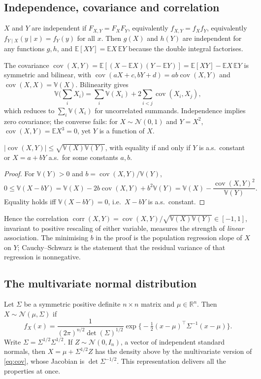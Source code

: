 \documentclass[11pt,a4paper]{article}
\newcommand{\E}{\mathbb{E}}
\newcommand{\V}{\mathbb{V}}
\newcommand{\R}{\mathbb{R}}
\newcommand{\N}{\mathcal{N}}
\newcommand{\Cov}{\operatorname{cov}}
\newcommand{\Corr}{\operatorname{corr}}
\begin{document}
\subsection{Independence, covariance and correlation}

$X$ and $Y$ are independent if $F_{X,Y}=F_XF_Y$, equivalently $f_{X,Y}=f_Xf_Y$, equivalently $f_{Y\mid X}(y\mid x)=f_Y(y)$ for all $x$. Then $g(X)$ and $h(Y)$ are independent for any functions $g,h$, and $\E[XY]=\E X\,\E Y$ because the double integral factorises.

The covariance $\Cov(X,Y)=\E[(X-\E X)(Y-\E Y)]=\E[XY]-\E X\,\E Y$ is symmetric and bilinear, with $\Cov(aX+c,bY+d)=ab\Cov(X,Y)$ and $\Cov(X,X)=\V(X)$. Bilinearity gives
\[
\V\Big(\sum_iX_i\Big)=\sum_i\V(X_i)+2\sum_{i<j}\Cov(X_i,X_j),
\]
which reduces to $\sum_i\V(X_i)$ for uncorrelated summands. Independence implies zero covariance; the converse fails: for $X\sim\N(0,1)$ and $Y=X^2$, $\Cov(X,Y)=\E X^3=0$, yet $Y$ is a function of $X$.

\begin{proposition}
$|\Cov(X,Y)|\le\sqrt{\V(X)\V(Y)}$, with equality if and only if $Y$ is a.s.\ constant or $X=a+bY$ a.s.\ for some constants $a,b$.
\end{proposition}

\begin{proof}
For $\V(Y)>0$ and $b=\Cov(X,Y)/\V(Y)$,
\[
0\le\V(X-bY)=\V(X)-2b\Cov(X,Y)+b^2\V(Y)=\V(X)-\frac{\Cov(X,Y)^2}{\V(Y)}.
\]
Equality holds iff $\V(X-bY)=0$, i.e.\ $X-bY$ is a.s.\ constant.
\end{proof}

Hence the correlation $\Corr(X,Y)=\Cov(X,Y)/\sqrt{\V(X)\V(Y)}\in[-1,1]$, invariant to positive rescaling of either variable, measures the strength of \emph{linear} association. The minimising $b$ in the proof is the population regression slope of $X$ on $Y$; Cauchy--Schwarz is the statement that the residual variance of that regression is nonnegative.

\subsection{The multivariate normal distribution}\label{sec:gauss}

Let $\Sigma$ be a symmetric positive definite $n\times n$ matrix and $\mu\in\R^n$. Then $X\sim\N(\mu,\Sigma)$ if
\[
f_X(x)=\frac{1}{(2\pi)^{n/2}\det(\Sigma)^{1/2}}\exp\Big\{-\tfrac12(x-\mu)^\top\Sigma^{-1}(x-\mu)\Big\}.
\]
Write $\Sigma=\Sigma^{1/2}\Sigma^{1/2}$. If $Z\sim\N(0,I_n)$, a vector of independent standard normals, then $X=\mu+\Sigma^{1/2}Z$ has the density above by the multivariate version of \eqref{eq:cov}, whose Jacobian is $\det\Sigma^{-1/2}$. This representation delivers all the properties at once.
\end{document}
